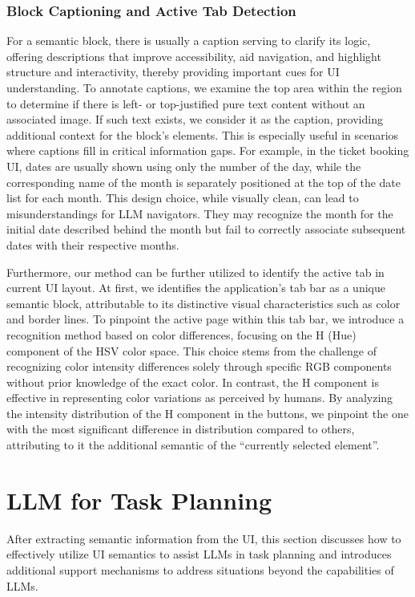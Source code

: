 \subsubsection{Block Captioning and Active Tab Detection}

For a semantic block, there is usually a caption serving to clarify its logic, offering descriptions that improve accessibility, aid navigation, and highlight structure and interactivity, thereby providing important cues for UI understanding. To annotate captions, we examine the top area within the region to determine if there is left- or top-justified pure text content without an associated image. If such text exists, we consider it as the caption, providing additional context for the block's elements. This is especially useful in scenarios where captions fill in critical information gaps. For example, in the ticket booking UI, dates are usually shown using only the number of the day, while the corresponding name of the month is separately positioned at the top of the date list for each month. This design choice, while visually clean, can lead to misunderstandings for LLM navigators. They may recognize the month for the initial date described behind the month but fail to correctly associate subsequent dates with their respective months. 

Furthermore, our method can be further utilized to identify the active tab in current UI layout. At first, we identifies the application's tab bar as a unique semantic block, attributable to its distinctive visual characteristics such as color and border lines. To pinpoint the active page within this tab bar, we introduce a recognition method based on color differences, focusing on the H (Hue) component of the HSV color space. This choice stems from the challenge of recognizing color intensity differences solely through specific RGB components without prior knowledge of the exact color. In contrast, the H component is effective in representing color variations as perceived by humans. By analyzing the intensity distribution of the H component in the buttons, we pinpoint the one with the most significant difference in distribution compared to others, attributing to it the additional semantic of the ``currently selected element''.

\section{LLM for Task Planning}
After extracting semantic information from the UI, this section discusses how to effectively utilize UI semantics to assist LLMs in task planning and introduces additional support mechanisms to address situations beyond the capabilities of LLMs.

